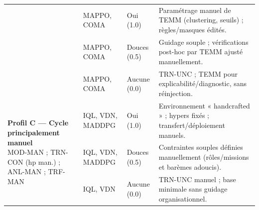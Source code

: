 \begin{table}[h!]
\begin{tabularx}{\textwidth}{p{4.1cm}p{3.4cm}p{2.7cm}X}
                                      & MAPPO, COMA                                                                                                                                                                                                   & Oui (1.0)                          & Paramétrage manuel de TEMM (clustering, seuils) ; règles/masques édités.             \\
                                      & MAPPO, COMA                                                                                                                                                                                                   & Douces (0.5)                       & Guidage souple ; vérifications post-hoc par TEMM ajusté manuellement.                \\
                                      & MAPPO, COMA                                                                                                                                                                                                   & Aucune (0.0)                       & TRN-UNC ; TEMM pour explicabilité/diagnostic, sans réinjection.                      \\
    \midrule
    \multirow{3}{*}{\parbox{4.1cm}{\textbf{Profil C — Cycle principalement manuel}                                                                                                                                                                                                                                                                                                \\MOD-MAN ; TRN-CON (hp man.) ; ANL-MAN ; TRF-MAN}}
                                      & IQL, VDN, MADDPG                                                                                                                                                                                              & Oui (1.0)                          & Environnement « handcrafted » ; hypers fixés ; transfert/déploiement manuels.        \\
                                      & IQL, VDN, MADDPG                                                                                                                                                                                              & Douces (0.5)                       & Contraintes souples définies manuellement (rôles/missions et barèmes adoucis).       \\
                                      & IQL, VDN                                                                                                                                                                                                      & Aucune (0.0)                       & TRN-UNC manuel ; base minimale sans guidage organisationnel.                         \\

\end{tabularx}
\end{table}
